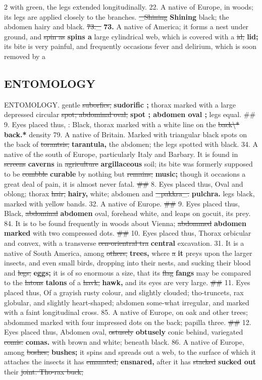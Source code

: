 \documentclass[10pt]{article}
\begin{document}
\begin{multicols}{2}
with green, the legs extended longitudinally. 22. A native of Europe, in woods; its legs are applied closely to the branches. \sout{\_Shining} \textbf{Shining} black; the abdomen hairy and black. \sout{73.\_} \textbf{73.} A native of America; it forms a nest under ground, and \sout{spin as} \textbf{spins a} large cylindrical web, which is covered with a \sout{id;} \textbf{lid;} its bite is very painful, and frequently occasions fever and delirium, which is soon removed by a

\subsection*{ENTOMOLOGY}
ENTOMOLOGY. gentle \sout{suborfics,} \textbf{sudorific ;} thorax marked with a large depressed circular \sout{spot; abdominal oval;} \textbf{spot ; abdomen oval ;} legs equal. \#\# 9. Eyes placed thus, : Black, thorax marked with a white line on the \sout{back\textbackslash{}*} \textbf{back.*} density 79. A native of Britain. Marked with triangular black spots on the back of \sout{torantsis,} \textbf{tarantula,} the abdomen; the legs spotted with black. 34. A native of the south of Europe, particularly Italy and Barbary. It is found in \sout{screens} \textbf{caverns} in \sout{agriculture} \textbf{argillaceous} soil; its bite was formerly supposed to be \sout{combble} \textbf{curable} by nothing but \sout{remains;} \textbf{music;} though it occasions a great deal of pain, it is almost never fatal. \sout{\#\#} 8. Eyes placed thus, Oval and oblong; thorax \sout{hair,} \textbf{hairy,} white; abdomen and \sout{\_pakkra\_.} \textbf{pulchra.} legs black, marked with yellow bands. 32. A native of Europe. \sout{\#\#} 9. Eyes placed thus, Black, \sout{abdominal} \textbf{abdomen} oval, forehead white, and leaps on gocuit, its prey. 84. It is to be found frequently in woods about Vienna; \sout{abdommed} \textbf{abdomen marked} with two compressed dots. \sout{\#\#} 10. Eyes placed thus, Thorax orbicular and convex, with a transverse \sout{cen-orientral tra} \textbf{central} excavation. 31. It is a native of South America, among \sout{others,} \textbf{trees,} where \sout{a} \textbf{it} preys upon the larger insects, and even small birds, dropping into their nests, and sucking their blood and \sout{legs;} \textbf{eggs;} it is of so enormous a size, that its \sout{flag} \textbf{fangs} may be compared to the \sout{latons} \textbf{talons} of a \sout{havk,} \textbf{hawk,} and its eyes are very large. \sout{\#\#} 11. Eyes placed thus, Of a grayish rusty colour, and slightly clouded; tho-truncets, rax globular, and slightly heart-shaped; abdomen some-what irregular, and marked with a faint longitudinal cross. 85. A native of Europe, on oak and other trees; abdommed marked with four impressed dots on the back; papilla three. \sout{\#\#} 12. Eyes placed thus, Abdomen oval, \sout{ostusely} \textbf{obtusely} conic behind, variegated \sout{comis.} \textbf{comas.} with brown and white; beneath black. 86. A native of Europe, among \sout{boshes;} \textbf{bushes;} it spins and spreads out a web, to the surface of which it attaches the insects it has \sout{emanated,} \textbf{ensnared,} after it has \sout{stacked} \textbf{sucked out} their \sout{joint. Tho-rax buck,} 
\end{multicols}
\end{document}
